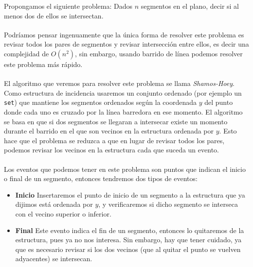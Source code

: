 Propongamos el siguiente problema: Dados $n$ segmentos en el plano, decir si al menos dos de ellos se intersectan.
\\\\Podríamos pensar ingenuamente que la única forma de resolver este problema es revisar todos los pares de segmentos y revisar intersección entre ellos, es decir una complejidad de $O(n^2)$, sin embargo, usando barrido de línea podemos resolver este problema más rápido.
\\\\El algoritmo que veremos para resolver este problema se llama \textit{Shamos-Hoey}. Como estructura
de incidencia usaremos un conjunto ordenado (por ejemplo un \texttt{set}) que mantiene los segmentos ordenados según la coordenada $y$ del punto donde cada uno es cruzado por la línea barredora en ese momento. El algoritmo se basa en que si dos segmentos se
llegaran a intersecar existe un momento durante el barrido en el que son vecinos en la estructura ordenada por $y$. Esto hace que el problema se reduzca a que en lugar de revisar todos los pares, podemos revisar los vecinos en la estructura cada que suceda un evento.
\\\\Los eventos que podemos tener en este problema son puntos que indican el inicio o final de un segmento, entonces tendremos dos tipos de eventos:
\begin{itemize}
  \item \textbf{Inicio} Insertaremos el punto de inicio de un segmento a la estructura que ya dijimos está ordenada por $y$, y verificaremos si dicho segmento se interseca con el vecino superior o inferior.
  \item \textbf{Final} Este evento indica el fin de un segmento, entonces lo quitaremos de la estructura, pues ya no nos interesa. Sin embargo, hay que tener cuidado, ya que es necesario revisar si los dos vecinos (que al quitar el punto se vuelven adyacentes) se intersecan.
\end{itemize}

